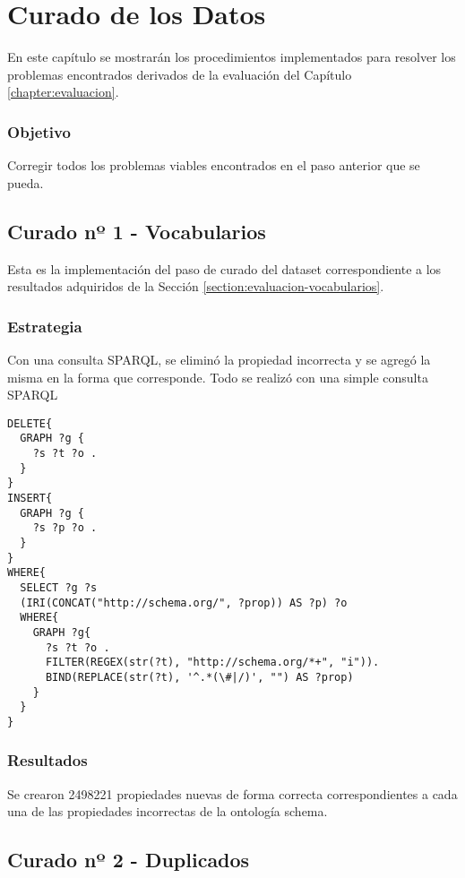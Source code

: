 \chapter{Curado de los Datos}
\label{chapter:curado}

\noindent En este capítulo se mostrarán los procedimientos implementados para resolver los problemas encontrados derivados de la evaluación 
del Capítulo \ref{chapter:evaluacion}.

\subsection*{Objetivo}
Corregir todos los problemas viables encontrados en el paso anterior que se pueda.

\section{Curado nº 1 - Vocabularios}
\label{section:curado-vocabularios}

\noindent Esta es la implementación del paso de curado del dataset correspondiente a los resultados adquiridos de la Sección \ref{section:evaluacion-vocabularios}.

\subsection*{Estrategia}
Con una consulta SPARQL, se eliminó la propiedad incorrecta y se agregó la misma en la forma que corresponde.
Todo se realizó con una simple consulta SPARQL

\newpage
\begin{lstlisting}[frame=single]  
DELETE{
  GRAPH ?g {
    ?s ?t ?o .
  }
}
INSERT{
  GRAPH ?g {
    ?s ?p ?o .
  }
}
WHERE{
  SELECT ?g ?s 
  (IRI(CONCAT("http://schema.org/", ?prop)) AS ?p) ?o
  WHERE{
    GRAPH ?g{
      ?s ?t ?o .
      FILTER(REGEX(str(?t), "http://schema.org/*+", "i")).
      BIND(REPLACE(str(?t), '^.*(\#|/)', "") AS ?prop)
    }
  }
}
\end{lstlisting}


\subsection*{Resultados}
Se crearon 2498221 propiedades nuevas de forma correcta correspondientes a cada una de las propiedades incorrectas de la ontología 
schema.

\section{Curado nº 2 - Duplicados}
\label{section:curado-duplicados}

